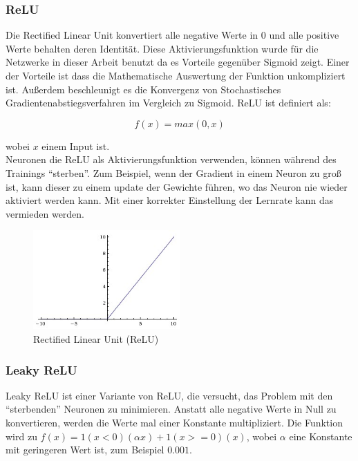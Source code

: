 \subsubsection{ReLU}
Die Rectified Linear Unit konvertiert alle negative Werte in 0 und alle positive Werte behalten deren Identität. Diese Aktivierungsfunktion
wurde für die Netzwerke in dieser Arbeit benutzt da es Vorteile gegenüber Sigmoid zeigt. Einer der Vorteile ist dass die Mathematische
Auswertung der Funktion unkompliziert ist. Außerdem beschleunigt es die Konvergenz von Stochastisches Gradientenabstiegsverfahren im Vergleich zu Sigmoid.
ReLU ist definiert als:

\begin{equation}
  f(x) = max(0, x)
\end{equation}

wobei $x$ einem Input ist.
\\
Neuronen die ReLU als Aktivierungsfunktion verwenden, können während des Trainings ``sterben''. Zum Beispiel, wenn der Gradient in einem Neuron
zu groß ist, kann dieser zu einem update der Gewichte führen, wo das Neuron nie wieder aktiviert werden kann. Mit einer korrekter Einstellung der
Lernrate kann das vermieden werden. \cite{cs231-neural-networks}

\begin{figure}[H]
  \centering
  \includegraphics[width=0.5\textwidth]{resources/nn/relu.jpeg}
  \caption{
    Rectified Linear Unit (ReLU) 
    \cite{neuron-model}
  }
  \label{image:relu}
\end{figure}

\subsubsection{Leaky ReLU}
Leaky ReLU ist einer Variante von ReLU, die versucht, das Problem mit den ``sterbenden'' Neuronen zu minimieren. Anstatt alle negative Werte
in Null zu konvertieren, werden die Werte mal einer Konstante multipliziert. Die Funktion wird zu $ f(x) = 1(x < 0)(\alpha x) + 1(x >= 0)(x)$,
wobei $ \alpha $ eine Konstante mit geringeren Wert ist, zum Beispiel $ 0.001 $.

